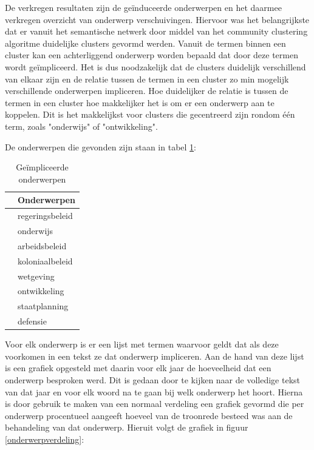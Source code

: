 De verkregen resultaten zijn de geïnduceerde onderwerpen en het daarmee verkregen overzicht van onderwerp verschuivingen. Hiervoor was het belangrijkste dat er vanuit het semantische netwerk door middel van het community clustering algoritme duidelijke clusters gevormd werden. Vanuit de termen binnen een cluster kan een achterliggend onderwerp worden bepaald dat door deze termen wordt geïmpliceerd. Het is dus noodzakelijk dat de clusters duidelijk verschillend van elkaar zijn en de relatie tussen de termen in een cluster zo min mogelijk verschillende onderwerpen impliceren. Hoe duidelijker de relatie is tussen de termen in een cluster hoe makkelijker het is om er een onderwerp aan te koppelen. Dit is het makkelijkst voor clusters die gecentreerd zijn rondom één term, zoals "onderwijs" of "ontwikkeling". 

De onderwerpen die gevonden zijn staan in tabel \ref{onderwerpen}:
\begin{table}[htb]
\centering
\begin{tabular}{ll}
\toprule
{} &                Onderwerpen \\
\midrule
 &  regeringsbeleid \\
 &        onderwijs \\
 &    arbeidsbeleid \\
 &  koloniaalbeleid \\
 &        wetgeving \\
 &     ontwikkeling \\
 &    staatplanning \\
 &         defensie \\
\bottomrule
\end{tabular}
\caption{Geïmpliceerde onderwerpen}
\label{onderwerpen}
\end{table}




Voor elk onderwerp is er een lijst met termen waarvoor geldt dat als deze voorkomen in een tekst ze dat onderwerp impliceren. Aan de hand van deze lijst is een grafiek opgesteld met daarin voor elk jaar de hoeveelheid dat een onderwerp besproken werd. Dit is gedaan door te kijken naar de volledige tekst van dat jaar en voor elk woord na te gaan bij welk onderwerp het hoort. Hierna is door gebruik te maken van een normaal verdeling een grafiek gevormd die per onderwerp procentueel aangeeft hoeveel van de troonrede besteed was aan de behandeling van dat onderwerp. Hieruit volgt de grafiek in figuur \ref{onderwerpverdeling}:

